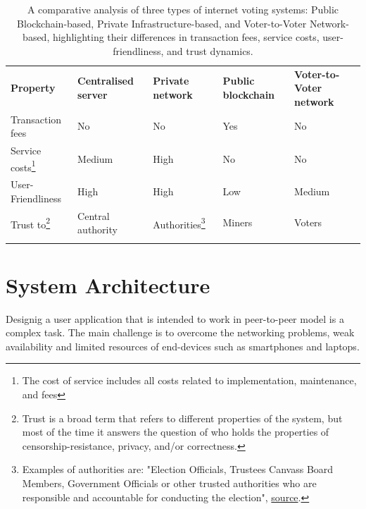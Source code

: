 \documentclass{article}
\begin{document}
\begin{table}[!h]
\centering
\newcommand{\YES}{\cellcolor{red!50}Yes}
\newcommand{\NO}{\cellcolor{green!50}No}
\caption{A comparative analysis of three types of internet voting systems: Public Blockchain-based, Private Infrastructure-based, and Voter-to-Voter Network-based, highlighting their differences in transaction fees, service costs, user-friendliness, and trust dynamics.}
\begin{tabular}{p{}p{}p{}p{}p{}}
\noalign{\smallskip}\hline\noalign{\smallskip}
\textbf{Property} & \textbf{Centralised server} & \textbf{Private network} & \textbf{Public blockchain} & \textbf{Voter-to-Voter network}\\
\noalign{\smallskip}\hline\noalign{\smallskip}
Transaction fees & \NO & \NO & \YES & \NO \\
\hline
Service costs\footnote{The cost of service includes all costs related to implementation, maintenance, and fees} & \cellcolor{yellow!50} Medium & \cellcolor{red!50} High & \cellcolor{green!50} No  & \cellcolor{green!50} No \\
\hline
User-Friendliness & \cellcolor{green!50} High & \cellcolor{green!50}High & \cellcolor{red!50} Low & \cellcolor{yellow!50} Medium \\
\hline
Trust to\footnote{Trust is a broad term that refers to different properties of the system, but most of the time it answers the question of who holds the properties of censorship-resistance, privacy, and/or correctness.} & \cellcolor{red!50} Central authority & \cellcolor{yellow!50} Authorities\footnote{Examples of authorities are: "Election Officials, Trustees Canvass Board Members, Government Officials or other trusted authorities who are responsible and accountable for conducting the election", \href{http://www.electionguard.vote/basics/steps/1_Key_Ceremony/}{source}.} & \cellcolor{yellow!50} Miners & \cellcolor{yellow!50} Voters  \\
\noalign{\smallskip}\hline

\hline
\end{tabular}
\end{table}

\section{System Architecture}
Designig a user application that is intended to work in peer-to-peer model is a complex task. The main challenge is to overcome the networking problems, weak availability and limited resources of end-devices such as smartphones and laptops.
\end{document}
